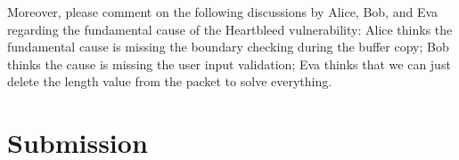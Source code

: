Moreover, please comment on the following discussions by Alice, Bob, and
Eva regarding the fundamental cause of the Heartbleed vulnerability: 
Alice thinks the fundamental cause is missing the
boundary checking during the buffer copy; Bob thinks the cause is missing the
user input validation; Eva thinks that we can just delete the length value
from the packet to solve everything. 




\section{Submission}

\seedsubmission



